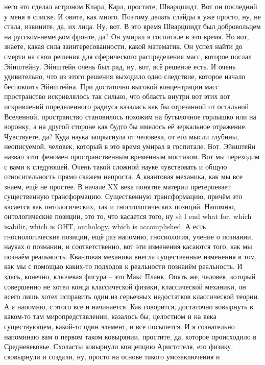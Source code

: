 него это сделал астроном Кларл, Карл, простите, Шварцшидт. Вот он последний у
меня в списке. И овите, как много. Поэтому делать слайды я уже просто, ну, не
стала, извините, да, их лица. Ну, вот. В это время Шварцшидт был добровольцем на
русском-немецком фронте, да? Он умирал в госпитале в это время. Но вот, знаете,
какая сила заинтересованности, какой математик. Он успел найти до смерти на свои
решения для сферического распределения масс, которое послал Эйнштейну. Эйнштейн
очень был рад, ну, вот, всё решение есть. И очень удивительно, что из этого
решения выходило одно следствие, которое начало беспокоить Эйнштейна. При
достаточно высокой концентрации масс пространство искривлялось так сильно, что
область внутри вот этих вот искривлений определенного радиуса казалась как бы
отрезанной от остальной Вселенной, пространство становилось похожим на
бутылочное горлышко или на воронку, а на другой стороне как будто бы имелось её
зеркальное отражение. Чувствуете, да? Куда наука запрыгнула от человека, от его
мысли глубины, неописуемой, человек, который в это время умирал в госпитале.
Вот. Эйнштейн назвал этот феномен пространственным временным мостиком. Вот мы
переходим с вами к следующей. Очень такой сложной науке чувствовать и общую
относительность прямо скажем непроста. А квантовая механика, как мы все знаем,
ещё не простее. В начале XX века понятие материи претерпевает существенную
трансформацию. Существенную трансформацию, причём это касается как
онтологических, так и гносиологических позиций. Напомню, онтологические позиции,
это то, что касается того, ну sẽ I end what for, which isabilir, which is OHT,
onthology, which is accomplished. А есть гносиологические позиции, ещё раз
напомню, гносиология, учение о познании, науках о познании, и соответственно,
вот эти изменения касаются того, как мы познаём реальность. Квантовая механика
внесла существенные изменения в том, как мы с помощью каких-то подходов к
реальности познанём реальность. И здесь, конечно, ключевая фигура – это Макс
Планк. Опять же, человек, который совершенно не хотел конца классической физики,
классической механики, он всего лишь хотел исправить один из серьезных
недостатков классической теории. А я напомню, с этого все и начинается. Как
говорится, достаточно ковырнуть в каком-то там миропредставлении, казалось бы,
целостном и на века существующем, какой-то один элемент, и все посыпется. И я
сознательно напоминаю вам о первом таком ковырянии, простите, да, которое
происходило в Средневековье. Схоласты ковырнули концепцию Аристотеля, его
физику, сковырнули и создали, ну, просто на основе такого умозаключения и
